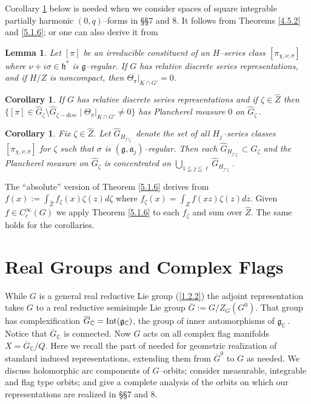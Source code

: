 \documentclass{conm-p-l}
\newtheorem{lemma}[equation]{Lemma}
\newtheorem{corollary}[equation]{Corollary}
\renewcommand{\gg}{\mathfrak{g}}
\def\ga{\mathfrak{a}}
\def\gg{\mathfrak{g}}
\def\gh{\mathfrak{h}}
\def\Int{{\rm Int}}
\def\C{\mathbb{C}}
\begin{document}
Corollary \ref{5.7.3} below is needed when we consider spaces of square 
integrable partially harmonic $(0,q)$--forms in \S\S 7 and 8.
It follows from Theorems \ref{4.5.2} and \ref{5.1.6}; or one can
also derive it from 

\begin{lemma}\label{5.7.2}
Let $[\pi]$ be an irreducible constituent of an $H$--series class
$[\pi_{\chi,\nu,\sigma}]$ where $\nu + i\sigma \in \gh^*$ is
$\gg$--regular.  If $G$ has relative discrete series representations,
and if $H/Z$ is noncompact, then $\Theta_\pi|_{K\cap G'} = 0$.
\end{lemma}

\begin{corollary}\label{5.7.3}
If $G$ has relative discrete series representations and if $\zeta \in
\widehat{Z}$ then $\{[\pi] \in \widehat{G}_\zeta \setminus 
\widehat{G}_{\zeta-disc} \mid \Theta_\pi|_{K\cap G'} \ne 0\}$
has Plancherel measure $0$ on $\widehat{G}_\zeta$\,.
\end{corollary}

\begin{corollary}\label{5.7.4}
Fix $\zeta \in \widehat{Z}$.  Let $\widehat{G}_{H_j,_\zeta}$ denote
the set of all $H_j$--series classes $[\pi_{\chi,\nu,\sigma}]$ for
$\zeta$ such that $\sigma$ is $(\gg,\ga_j)$--regular.  Then each
$\widehat{G}_{H_j,_\zeta} \subset \widehat{G}_\zeta$ and the
Plancherel measure on $\widehat{G}_\zeta$ is concentrated on
$\bigcup_{1\leqq j\leqq\ell} \widehat{G}_{H_j,_\zeta}$\,.
\end{corollary}

The ``absolute'' version of Theorem \ref{5.1.6} derives from 
$f(x) := \int_{\widehat{Z}} f_\zeta(x)\zeta(z)d\zeta$ where
$f_\zeta(x) = \int_Z f(xz)\zeta(z)dz$.  Given $f \in C^\infty_c(G)$ we
apply Theorem \ref{5.1.6} to each $f_\zeta$ and sum over $\widehat{Z}$.
The same holds for the corollaries.

\section{Real Groups and Complex Flags}
\label{sec6}
\setcounter{equation}{0}

While $G$ is a general real reductive Lie group (\ref{1.2.2}) the
adjoint representation takes $G$ to a real reductive semisimple Lie
group $\overline{G} := G/Z_G(G^0)$.  That group has complexification
$\overline{G}_\C = \Int(\gg_\C)$, the group of inner automorphisms
of $\gg_\C$\,.  Notice that $\overline{G}_\C$ is connected. 
Now $G$ acts on all complex flag manifolds
$X = \overline{G}_\C/Q$.  Here we recall the part of \cite{W1969}
needed for geometric realization of standard induced representations,
extending them from $\overline{G}^0$ to $G$ as needed.  We discuss
holomorphic arc components of $G$--orbits; consider measurable,
integrable and flag type orbits; and give a complete analysis of the
orbits on which our representations are realized in \S\S 7 and 8.
\end{document}
